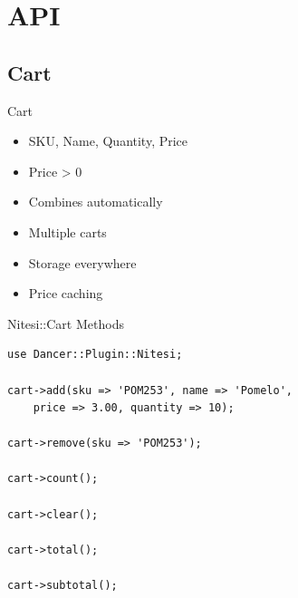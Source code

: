 



\section{API}
\subsection{Cart}
\begin{frame}{Cart}
\begin{itemize}
\item SKU, Name, Quantity, Price
\item Price > 0
\item Combines automatically
\item Multiple carts
\item Storage everywhere
\item Price caching
\end{itemize}
\end{frame}

\begin{frame}[fragile]{Nitesi::Cart Methods}
\begin{lstlisting}
use Dancer::Plugin::Nitesi;

cart->add(sku => 'POM253', name => 'Pomelo',
    price => 3.00, quantity => 10);

cart->remove(sku => 'POM253');

cart->count();

cart->clear();

cart->total();

cart->subtotal();
\end{lstlisting}
\end{frame}

